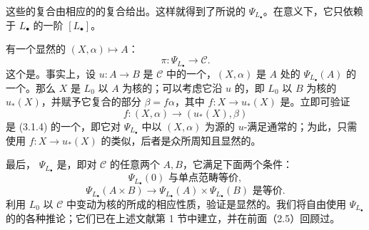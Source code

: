 这些的复合由相应的的复合给出。这样就得到了所说的 $\Psi_{L_\bullet}$。在意义下，它只依赖于 $L_\bullet$ 的一阶 $[L_\bullet]$。

有一个显然的 $(X,\alpha)\mapsto A$：
\[
\pi:\Psi_{L_\bullet}\longrightarrow\mathcal C.\tag{3.1.4}
\]
这个是。事实上，设 $u:A\to B$ 是 $\mathcal C$ 中的一个，$(X,\alpha)$ 是 $A$ 处的 $\Psi_{L_\bullet}(A)$ 的一个。那么 $X$ 是 $L_0$ 以 $A$ 为核的；可以考虑它沿 $u$ 的，即 $L_0$ 以 $B$ 为核的 $u_*(X)$，并赋予它复合的部分 $\beta=f\alpha$，其中 $f:X\to u_*(X)$ 是。立即可验证
\[
f:(X,\alpha)\longrightarrow(u_*(X),\beta)
\]
是 (3.1.4) 的一个，即它对 $\Psi_{L_\bullet}$ 中以 $(X,\alpha)$ 为源的 $u$-满足通常的；为此，只需使用 $f:X\to u_*(X)$ 的类似，后者是众所周知且显然的。

最后， $\Psi_{L_\bullet}$ 是，即对 $\mathcal C$ 的任意两个 $A,B$，它满足下面两个条件：
\[
\Psi_{L_\bullet}(0)\text{ 与单点范畴等价},\tag{3.1.5}
\]
\[
\Psi_{L_\bullet}(A\times B)\longrightarrow
\Psi_{L_\bullet}(A)\times\Psi_{L_\bullet}(B)\text{ 是等价}.\tag{3.1.6}
\]
利用 $L_0$ 以 $\mathcal C$ 中变动为核的所成的相应性质，验证是显然的。我们将自由使用
$\Psi_{L_\bullet}$ 的的各种推论；它们已在上述文献第 1 节中建立，并在前面（2.5）回顾过。

